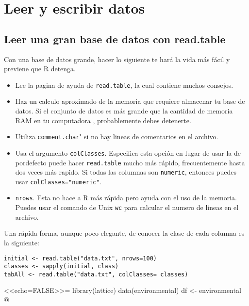 \section{Leer y escribir datos}
\label{sec:datos}


\subsection{Leer una gran base de datos con read.table}

Con una base de datos grande, hacer lo siguiente te hará la vida más fácil y previene que R detenga.
\begin{itemize}
 \item Lee la pagina de ayuda de \verb=read.table=, la cual contiene muchos consejos.
 \item Haz un calculo aproximado de la memoria que requiere almacenar tu base de datos. Si el conjunto de datos es más grande que la cantidad de memoria RAM en tu computadora , probablemente debes detenerte.
 \item Utiliza \verb=comment.char=" si no hay lineas de comentarios en el archivo.
 \item Usa el argumento \verb=colClasses=. Especifica esta opción en lugar de usar la de pordefecto puede hacer \verb=read.table= mucho más rápido, frecuentemente hasta dos veces más rapido. Si todas las columnas son \verb=numeric=, entonces puedes usar \verb$colClasses="numeric"$.
 \item \verb=nrows=. Esta no hace a R más rápida pero ayuda con el uso de la memoria. Puedes usar el comando de Unix \verb=wc= para calcular el numero de lineas en el archivo. 
\end{itemize}


Una rápida forma, aunque poco elegante, de conocer la clase de cada columna es la siguiente:
\begin{verbatim}
initial <- read.table("data.txt", nrows=100)
classes <- sapply(initial, class)
tabAll <- read.table("data.txt", colClasses= classes)
\end{verbatim}

  <<echo=FALSE>>=
  library(lattice)
  data(environmental)
  df <- environmental
  @

